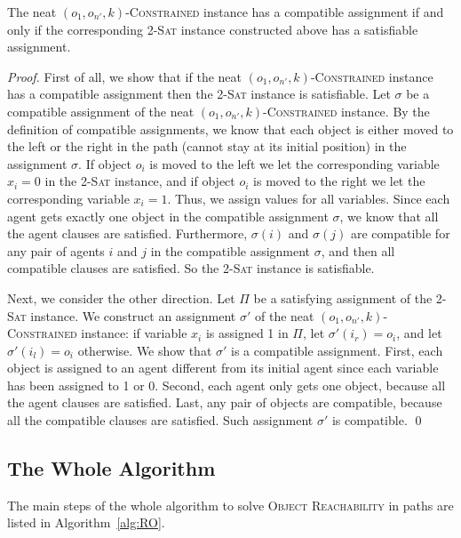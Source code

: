 \begin{lemma}\label{reduce2sat}
The neat $(o_1,o_{n'},k)$-\textsc{Constrained} instance
has a compatible assignment if and only if the corresponding \textsc{2-Sat} instance constructed above has a satisfiable assignment.
\end{lemma}
\begin{proof}
First of all, we show that if the neat $(o_1,o_{n'},k)$-\textsc{Constrained} instance
has a compatible assignment then the \textsc{2-Sat} instance is satisfiable.
Let $\sigma$ be  a compatible assignment of the neat $(o_1,o_{n'},k)$-\textsc{Constrained} instance.
By the definition of compatible assignments, we know that each object is either moved to the left or the right in the path (cannot stay at its initial position) in the assignment $\sigma$. If object $o_i$ is moved to the left we let the corresponding
variable $x_i=0$ in the \textsc{2-Sat} instance, and  if object $o_i$ is moved to the right we let the corresponding
variable $x_i=1$. Thus, we assign values for all variables. Since each agent gets exactly one object in the compatible assignment $\sigma$, we know that all the agent clauses are satisfied.
Furthermore, $\sigma(i)$ and $\sigma(j)$ are compatible for any pair of agents $i$ and $j$ in the compatible assignment $\sigma$, and then all compatible clauses are satisfied.
So the \textsc{2-Sat} instance is satisfiable.

Next, we consider the other direction. Let $\Pi$ be a satisfying assignment of the \textsc{2-Sat} instance.
We construct an assignment $\sigma'$ of the neat $(o_1,o_{n'},k)$-\textsc{Constrained} instance:
if variable $x_i$ is assigned 1 in $\Pi$, let $\sigma'(i_r)=o_i$, and let  $\sigma'(i_l)=o_i$ otherwise.
We show that $\sigma'$ is a compatible assignment. First, each object is assigned to an agent different from its initial agent since each variable has been assigned to 1 or 0.
Second, each agent only gets one object, because all the agent clauses are satisfied. Last, any pair of objects are compatible, because all the compatible clauses are satisfied.
Such assignment $\sigma'$ is compatible.
 \qed
\end{proof}

\subsection{The Whole Algorithm}

The main steps of the whole algorithm to solve \textsc{Object Reachability} in paths are listed in Algorithm~\ref{alg:RO}. %


